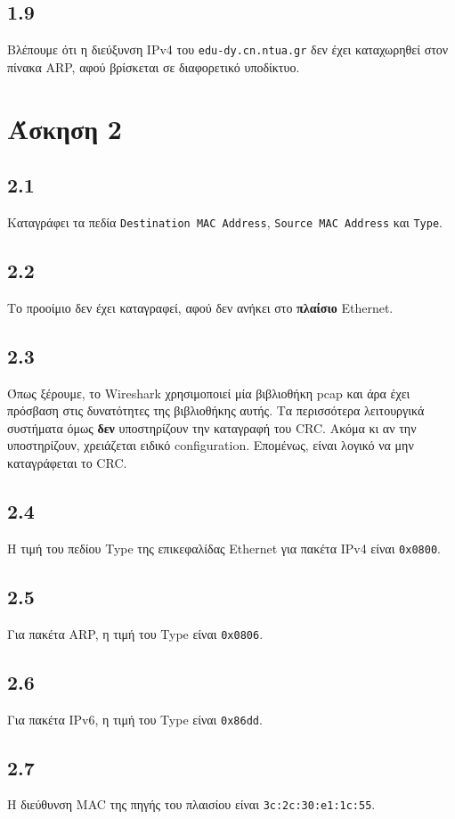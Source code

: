 		\subsection*{1.9}
			Βλέπουμε ότι η διεύξυνση IPv4 του \verb|edu-dy.cn.ntua.gr| δεν έχει καταχωρηθεί στον πίνακα ARP, αφού βρίσκεται σε διαφορετικό υποδίκτυο.
		
	\section*{Άσκηση 2}
		\subsection*{2.1}
			Καταγράφει τα πεδία \verb|Destination MAC Address|, \verb|Source MAC Address| και \verb|Type|.
		
		\subsection*{2.2}
			Το προοίμιο δεν έχει καταγραφεί, αφού δεν ανήκει στο \textbf{πλαίσιο} Ethernet.
		
		\subsection*{2.3}
			Όπως ξέρουμε, το Wireshark χρησιμοποιεί μία βιβλιοθήκη pcap και άρα έχει πρόσβαση στις δυνατότητες της βιβλιοθήκης αυτής. Τα περισσότερα λειτουργικά συστήματα όμως \textbf{δεν} υποστηρίζουν την καταγραφή του CRC. Ακόμα κι αν την υποστηρίζουν, χρειάζεται ειδικό configuration. Επομένως, είναι λογικό να μην καταγράφεται το CRC. 
		
		\subsection*{2.4}
			Η τιμή του πεδίου Type της επικεφαλίδας Ethernet για πακέτα IPv4 είναι \verb|0x0800|.
		
		\subsection*{2.5}
			Για πακέτα ARP, η τιμή του Type είναι \verb|0x0806|.
		
		\subsection*{2.6}
			Για πακέτα IPv6, η τιμή του Type είναι \verb|0x86dd|.
		
		\subsection*{2.7}
			Η διεύθυνση MAC της πηγής του πλαισίου είναι \verb|3c:2c:30:e1:1c:55|.
		
